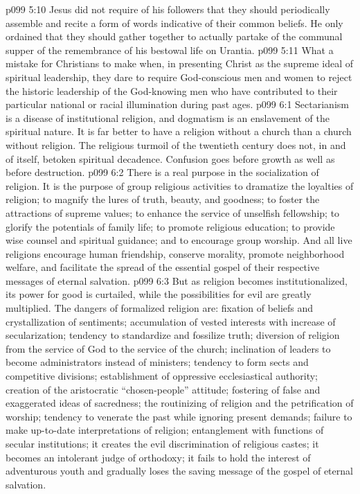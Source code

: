 \vs p099 5:10 Jesus did not require of his followers that they should periodically assemble and recite a form of words indicative of their common beliefs. He only ordained that they should gather together to actually  partake of the communal supper of the remembrance of his bestowal life on Urantia.
\vs p099 5:11 \pc What a mistake for Christians to make when, in presenting Christ as the supreme ideal of spiritual leadership, they dare to require God\hyp{}conscious men and women to reject the historic leadership of the God\hyp{}knowing men who have contributed to their particular national or racial illumination during past ages.
\vs p099 6:1 Sectarianism is a disease of institutional religion, and dogmatism is an enslavement of the spiritual nature. It is far better to have a religion without a church than a church without religion. The religious turmoil of the twentieth century does not, in and of itself, betoken spiritual decadence. Confusion goes before growth as well as before destruction.
\vs p099 6:2 There is a real purpose in the socialization of religion. It is the purpose of group religious activities to dramatize the loyalties of religion; to magnify the lures of truth, beauty, and goodness; to foster the attractions of supreme values; to enhance the service of unselfish fellowship; to glorify the potentials of family life; to promote religious education; to provide wise counsel and spiritual guidance; and to encourage group worship. And all live religions encourage human friendship, conserve morality, promote neighborhood welfare, and facilitate the spread of the essential gospel of their respective messages of eternal salvation.
\vs p099 6:3 But as religion becomes institutionalized, its power for good is curtailed, while the possibilities for evil are greatly multiplied. The dangers of formalized religion are: fixation of beliefs and crystallization of sentiments; accumulation of vested interests with increase of secularization; tendency to standardize and fossilize truth; diversion of religion from the service of God to the service of the church; inclination of leaders to become administrators instead of ministers; tendency to form sects and competitive divisions; establishment of oppressive ecclesiastical authority; creation of the aristocratic “chosen\hyp{}people” attitude; fostering of false and exaggerated ideas of sacredness; the routinizing of religion and the petrification of worship; tendency to venerate the past while ignoring present demands; failure to make up\hyp{}to\hyp{}date interpretations of religion; entanglement with functions of secular institutions; it creates the evil discrimination of religious castes; it becomes an intolerant judge of orthodoxy; it fails to hold the interest of adventurous youth and gradually loses the saving message of the gospel of eternal salvation.
